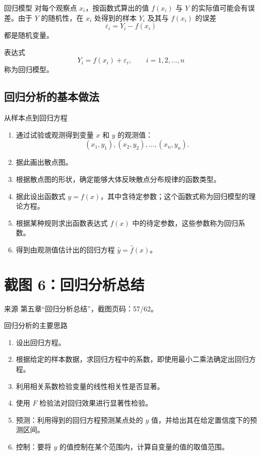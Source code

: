\documentclass[UTF8,zihao=-4,fontset=fandol]{ctexart}
\begin{document}
\begin{keybox}{回归模型}
对每个观察点 $x_i$，按函数式算出的值 $f(x_i)$ 与 $Y$ 的实际值可能会有误差。由于 $Y$ 的随机性，在 $x_i$ 处得到的样本 $Y_i$ 及其与 $f(x_i)$ 的误差
\[
\varepsilon_i=Y_i-f(x_i)
\]
都是随机变量。

表达式
\[
Y_i=f(x_i)+\varepsilon_i,\qquad i=1,2,\ldots,n
\]
称为回归模型。
\end{keybox}

\subsection{回归分析的基本做法}

\begin{methodbox}{从样本点到回归方程}
\begin{enumerate}
  \item 通过试验或观测得到变量 $x$ 和 $y$ 的观测值：
  \[
  (x_1,y_1),(x_2,y_2),\ldots,(x_n,y_n).
  \]
  \item 据此画出散点图。
  \item 根据散点图的形状，确定能够大体反映散点分布规律的函数类型。
  \item 据此设出函数式 $y=f(x)$，其中含待定参数；这个函数式称为回归模型的理论方程。
  \item 根据某种规则求出函数表达式 $f(x)$ 中的待定参数，这些参数称为回归系数。
  \item 得到由观测值估计出的回归方程 $\hat{y}=\hat{f}(x)$。
\end{enumerate}
\end{methodbox}

\section{截图 6：回归分析总结}

\begin{sourcebox}{来源}
第五章“回归分析总结”，截图页码：57/62。
\end{sourcebox}

\begin{methodbox}{回归分析的主要思路}
\begin{enumerate}
  \item 设出回归方程。
  \item 根据给定的样本数据，求回归方程中的系数，即使用最小二乘法确定出回归方程。
  \item 利用相关系数检验变量的线性相关性是否显著。
  \item 使用 $F$ 检验法对回归效果进行显著性检验。
  \item 预测：利用得到的回归方程预测某点处的 $y$ 值，并给出其在给定置信度下的预测区间。
  \item 控制：要将 $y$ 的值控制在某个范围内，计算自变量的值的取值范围。
\end{enumerate}
\end{methodbox}
\end{document}
